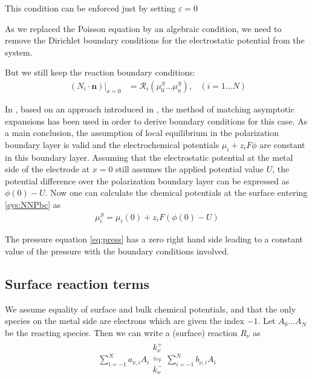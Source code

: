 \documentclass[12pt,oneside,reqno]{amsart}
\numberwithin{equation}{section}
\begin{document}
This condition can be enforced just by setting  $\varepsilon=0$

As we replaced the Poisson equation by an algebraic condition, we need to remove 
the Dirichlet boundary conditions for the electrostatic potential from the system.

But we still keep the reaction boundary conditions:
\begin{subequations}\label{sys:NNPbc}
\begin{align}\
  (N_i\cdot \mathbf n)|_{x=0}&=\mathcal R_i(\mu_0^S\dots\mu_n^S), & (i=1\dots N)
\end{align}
\end{subequations}

In \cite{guhlke2015theorie, dreyerBV}, based on an approach introduced in \cite{caginalp1988dynamics}, the method
of matching asymptotic expansions has been used in order to derive boundary conditions for
this case. As a main conclusion, the assumption of local equilibrium 
in the polarization boundary layer is valid and  the electrochemical potentials $\mu_i + z_i F \phi$ are constant in this boundary layer. Assuming that the electrostatic potential at the metal side of the electrode at $x=0$ still assumes the applied potential value $U$, the
potential difference over the polarization boundary layer can be expressed as $\phi(0)-U$.
Now one can  calculate the chemical potentials at the surface entering \eqref{sys:NNPbc} as
\begin{subequations}\label{sys:neubc}
   \begin{align}
     \mu_i^S=\mu_i(0) + z_i F(\phi(0)-U)
   \end{align}
 \end{subequations}

 The pressure equation \eqref{eq:press} has a zero right hand side leading to a
 constant value of the pressure with the boundary conditions involved.


 \subsection{Surface reaction terms}
 \cite{DreyerBV, MuellerPersonal}
We assume equality of surface and bulk chemical potentials, and that the only species on the metal
side are electrons which are given the index $-1$.
Let $A_0\dots A_N$ be the reacting species. Then we can write a (surface) reaction $R_\nu$ as
\begin{align}
  \sum_{i=-1}^N a_{\nu,i} A_i
  \begin{array}{c}
    k_\nu^+\\
    \leftrightharpoons \\
     k_\nu^-\\
  \end{array}
  \sum_{i=-1}^N b_{\nu,i} A_i
\end{align}
\end{document}

